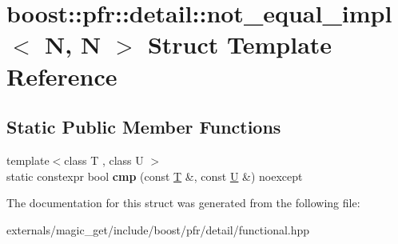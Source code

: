 \hypertarget{structboost_1_1pfr_1_1detail_1_1not__equal__impl_3_01_n_00_01_n_01_4}{}\section{boost\+:\+:pfr\+:\+:detail\+:\+:not\+\_\+equal\+\_\+impl$<$ N, N $>$ Struct Template Reference}
\label{structboost_1_1pfr_1_1detail_1_1not__equal__impl_3_01_n_00_01_n_01_4}
\subsection*{Static Public Member Functions}
\begin{DoxyCompactItemize}
\item 
\mbox{\label{structboost_1_1pfr_1_1detail_1_1not__equal__impl_3_01_n_00_01_n_01_4_a996b4bce71de3872b1d4852aa112817a}} 
{\footnotesize template$<$class T , class U $>$ }\\static constexpr bool {\bfseries cmp} (const \mbox{\hyperlink{struct_t}{T}} \&, const \mbox{\hyperlink{union_u}{U}} \&) noexcept
\end{DoxyCompactItemize}


The documentation for this struct was generated from the following file\+:\begin{DoxyCompactItemize}
\item 
externals/magic\+\_\+get/include/boost/pfr/detail/functional.\+hpp\end{DoxyCompactItemize}
